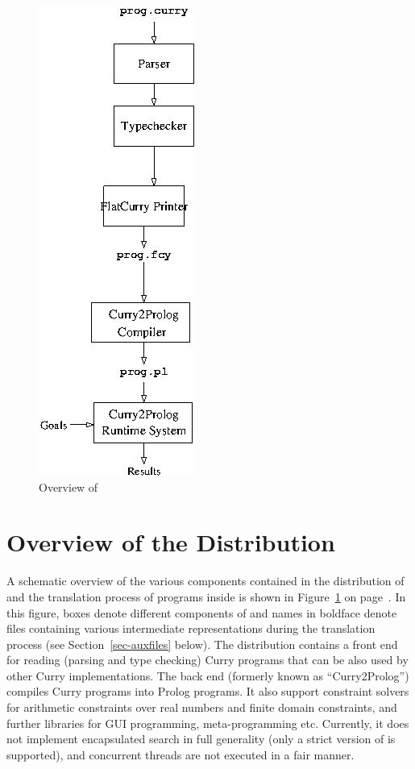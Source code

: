 \begin{figure}%
\begin{center}
 \includegraphics[scale=0.85]{pakcs_overview.jpg}
\end{center}\vspace{-5ex}
\caption{Overview of \CYS\label{fig-pakcs}}
\end{figure}

\section{Overview of the \CYS Distribution}

A schematic overview of the various components contained in
the distribution of \CYS and the
translation process of programs inside \CYS is shown in
Figure~\ref{fig-pakcs} on page~\pageref{fig-pakcs}.
In this figure, boxes denote different components of \CYS
and names in boldface denote files containing
various intermediate representations during the translation
process (see Section~\ref{sec-auxfiles} below).
The \CYS distribution contains a front end for reading (parsing and
type checking) Curry programs that can be also used by
other Curry implementations.
The back end (formerly known as ``Curry2Prolog'')
compiles Curry programs into Prolog programs.
It also support constraint solvers for
arithmetic constraints over real numbers and finite domain constraints,
and further libraries for GUI programming, meta-programming etc.
Currently, it does not implement encapsulated search in full generality
(only a strict version of  is supported),
and concurrent threads are not executed in a fair manner.


